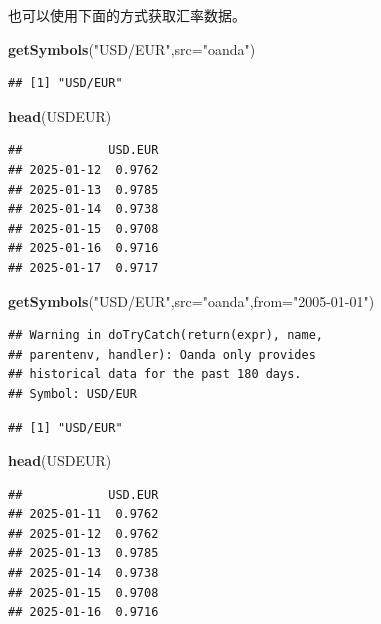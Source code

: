 \documentclass[]{ctexbook}
\newenvironment{Shaded}{\begin{snugshade}}{\end{snugshade}}
\newcommand{\AttributeTok}[1]{\textcolor[rgb]{0.13,0.29,0.53}{#1}}
\newcommand{\FunctionTok}[1]{\textcolor[rgb]{0.13,0.29,0.53}{\textbf{#1}}}
\newcommand{\NormalTok}[1]{#1}
\newcommand{\StringTok}[1]{\textcolor[rgb]{0.31,0.60,0.02}{#1}}
\begin{document}
也可以使用下面的方式获取汇率数据。

\begin{Shaded}
\begin{Highlighting}[]
\FunctionTok{getSymbols}\NormalTok{(}\StringTok{"USD/EUR"}\NormalTok{,}\AttributeTok{src=}\StringTok{"oanda"}\NormalTok{)}
\end{Highlighting}
\end{Shaded}

\begin{verbatim}
## [1] "USD/EUR"
\end{verbatim}

\begin{Shaded}
\begin{Highlighting}[]
\FunctionTok{head}\NormalTok{(USDEUR)}
\end{Highlighting}
\end{Shaded}

\begin{verbatim}
##            USD.EUR
## 2025-01-12  0.9762
## 2025-01-13  0.9785
## 2025-01-14  0.9738
## 2025-01-15  0.9708
## 2025-01-16  0.9716
## 2025-01-17  0.9717
\end{verbatim}

\begin{Shaded}
\begin{Highlighting}[]
\FunctionTok{getSymbols}\NormalTok{(}\StringTok{"USD/EUR"}\NormalTok{,}\AttributeTok{src=}\StringTok{"oanda"}\NormalTok{,}\AttributeTok{from=}\StringTok{"2005{-}01{-}01"}\NormalTok{)}
\end{Highlighting}
\end{Shaded}

\begin{verbatim}
## Warning in doTryCatch(return(expr), name,
## parentenv, handler): Oanda only provides
## historical data for the past 180 days.
## Symbol: USD/EUR
\end{verbatim}

\begin{verbatim}
## [1] "USD/EUR"
\end{verbatim}

\begin{Shaded}
\begin{Highlighting}[]
\FunctionTok{head}\NormalTok{(USDEUR)}
\end{Highlighting}
\end{Shaded}

\begin{verbatim}
##            USD.EUR
## 2025-01-11  0.9762
## 2025-01-12  0.9762
## 2025-01-13  0.9785
## 2025-01-14  0.9738
## 2025-01-15  0.9708
## 2025-01-16  0.9716
\end{verbatim}
\end{document}
